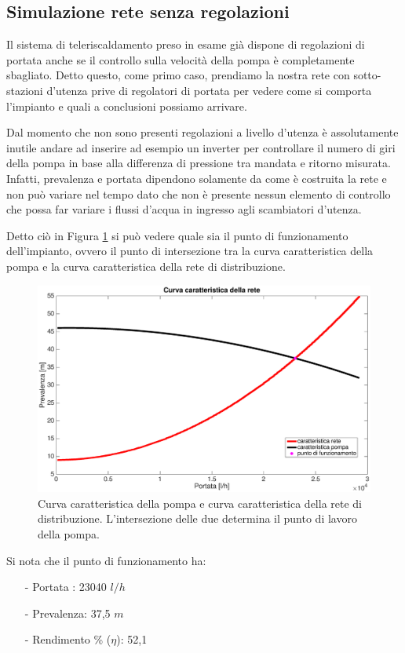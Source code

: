 \documentclass[laurea,oneside,11pt]{USiena_tesiLM}
\begin{document}
\subsection{Simulazione rete senza regolazioni}
Il sistema di teleriscaldamento preso in esame già dispone di regolazioni di portata anche se il controllo sulla velocità della pompa è completamente sbagliato. Detto questo, come primo caso, prendiamo la nostra rete con sotto-stazioni d'utenza prive di regolatori di portata per vedere come si comporta l'impianto e quali a conclusioni possiamo arrivare. 

Dal momento che non sono presenti regolazioni a livello d'utenza è assolutamente inutile andare ad inserire ad esempio un inverter per controllare il numero di giri della pompa in base alla differenza di pressione tra mandata e ritorno misurata. Infatti, prevalenza e portata dipendono solamente da come è costruita la rete e non può variare nel tempo dato che non è presente nessun elemento di controllo che possa far variare i flussi d'acqua in ingresso agli scambiatori d'utenza.

Detto ciò in Figura \ref{fig:sim1_noreg} si può vedere quale sia il punto di funzionamento dell'impianto, ovvero il punto di intersezione tra la curva caratteristica della pompa e la curva caratteristica della rete di distribuzione.

\begin{figure}[!ht]
\centering
\includegraphics[width=\textwidth]{figure/sim1_noreg} 
\caption{Curva caratteristica della pompa e curva caratteristica della rete di distribuzione. L'intersezione delle due determina il punto di lavoro della pompa. }
\label{fig:sim1_noreg}
\end{figure}

Si nota che il punto di funzionamento ha:
\begin{itemize}
\item[-] Portata : 23040 $l/h$
\item[-] Prevalenza: 37,5 $m$
\item[-] Rendimento \% ($\eta$): 52,1%
\end{itemize}
\end{document}
